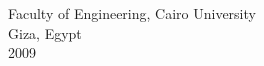 \documentclass[12pt,onehalfspacing]{SketchThesis}
\begin{document}
 \begin{center}
   Faculty of Engineering, Cairo University \\ Giza, Egypt \\  2009
\end{center}

\end{document}

